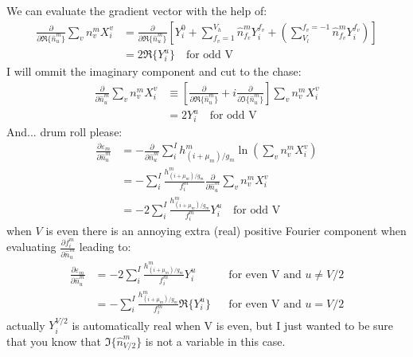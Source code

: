 \documentclass[11pt]{article}
\begin{document}
We can evaluate the gradient vector with the help of:
\begin{align*}
   \frac{\partial}{\partial \Re\{ \hat{n}^m_u \}} \sum_v n^m_v X^v_i &= \frac{\partial}{\partial \Re\{ \hat{n}^m_u \}}\left[Y^0_i + \sum_{f_v=1}^{V_h} \hat{n}^m_{f_v} Y^{f_v}_i + \left(\sum_{V_l}^{f_v=-1} \hat{n}^m_{f_v} Y^{f_v}_i\right) \right] \\
   &= 2 \Re\{Y^{u}_i\} \quad \text{for odd V} 
\end{align*}
I will ommit the imaginary component and cut to the chase:
\begin{align*}
   \frac{\partial}{\partial \hat{n}^m_u} \sum_v n^m_v X^v_i &\equiv \left[\frac{\partial}{\partial \Re\{ \hat{n}^m_u \}} + i \frac{\partial}{\partial \Im\{ \hat{n}^m_u \}}\right]  \sum_v n^m_v X^v_i \\
   &= 2 Y^{u}_i \quad \text{for odd V} 
\end{align*}
And... drum roll please:
\begin{align*}
   \frac{\partial \varepsilon_m}{\partial \hat{n}^m_u}  &= -\frac{\partial}{\partial \hat{n}^m_u} \sum_i^I h^m_{(i+\mu_m)/g_m} \ln\left(\sum_v n^m_v X^v_i\right) \\
   &= - \sum_i^I \frac{h^m_{(i+\mu_m)/g_m}}{f^m_i} \frac{\partial}{\partial \hat{n}^m_u} \sum_v n^m_v X^v_i \\
   &= - 2 \sum_i^I \frac{h^m_{(i+\mu_m)/g_m}}{f^m_i} Y^{u}_i \quad \text{for odd V} 
\end{align*}
when $V$ is even there is an annoying extra (real) positive Fourier component when evaluating $\frac{\partial f^m_i}{\partial \hat{n}^m_u}$ leading to:
\begin{align*}
   \frac{\partial \varepsilon_m}{\partial \hat{n}^m_u} &= - 2 \sum_i^I \frac{h^m_{(i+\mu_m)/g_m}}{f^m_i} Y^{u}_i && \text{for even V and } u \neq V/2 \\
   &= - \sum_i^I \frac{h^m_{(i+\mu_m)/g_m}}{f^m_i} \Re\{Y^{u}_i\} &&\text{for even V and } u = V/2 
\end{align*}
actually $Y^{V/2}_i$ is automatically real when V is even, but I just wanted to be sure that you know that $\Im\{ \hat{n}^m_{V/2}\}$ is not a variable in this case.
\end{document}

